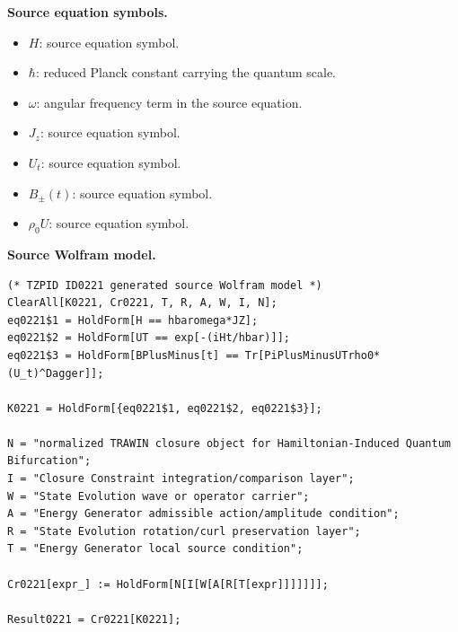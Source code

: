 \begin{minipage}[t]{0.49\linewidth}
\begingroup
\small
\raggedright
\textbf{Source equation symbols.}\par
\begin{itemize}[leftmargin=1.35em,itemsep=1pt,topsep=1pt,parsep=0pt]
    \item $H$: source equation symbol.
    \item $\hbar$: reduced Planck constant carrying the quantum scale.
    \item $\omega$: angular frequency term in the source equation.
    \item $J_z$: source equation symbol.
    \item $U_t$: source equation symbol.
    \item $B_{\pm}(t)$: source equation symbol.
    \item $\rho_0U$: source equation symbol.
\end{itemize}
\endgroup
\end{minipage}\hfill
\begin{minipage}[t]{0.47\linewidth}
\begingroup
\scriptsize
\raggedright
\textbf{Source Wolfram model.}\par
\begin{Verbatim}[fontsize=\tiny,breaklines=true,breakanywhere=true]
(* TZPID ID0221 generated source Wolfram model *)
ClearAll[K0221, Cr0221, T, R, A, W, I, N];
eq0221$1 = HoldForm[H == hbaromega*JZ];
eq0221$2 = HoldForm[UT == exp[-(iHt/hbar)]];
eq0221$3 = HoldForm[BPlusMinus[t] == Tr[PiPlusMinusUTrho0*(U_t)^Dagger]];

K0221 = HoldForm[{eq0221$1, eq0221$2, eq0221$3}];

N = "normalized TRAWIN closure object for Hamiltonian-Induced Quantum Bifurcation";
I = "Closure Constraint integration/comparison layer";
W = "State Evolution wave or operator carrier";
A = "Energy Generator admissible action/amplitude condition";
R = "State Evolution rotation/curl preservation layer";
T = "Energy Generator local source condition";

Cr0221[expr_] := HoldForm[N[I[W[A[R[T[expr]]]]]]];

Result0221 = Cr0221[K0221];
\end{Verbatim}
\endgroup
\end{minipage}

